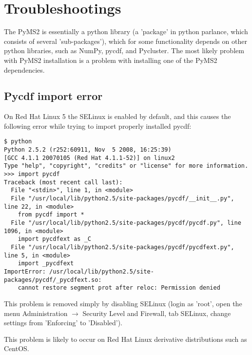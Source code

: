 \section{Troubleshootings}

The PyMS2 is essentially a python library (a 'package' in python parlance, which
consists of several 'sub-packages'), which for some functionality depends on
other python libraries, such as NumPy, pycdf, and Pycluster. The most likely
problem with PyMS2 installation is a problem with installing one of the PyMS2
dependencies.

\subsection{Pycdf import error}

On Red Hat Linux 5 the SELinux is enabled by default, and this causes the
following error while trying to import properly installed pycdf: 

\begin{verbatim}
$ python
Python 2.5.2 (r252:60911, Nov  5 2008, 16:25:39)
[GCC 4.1.1 20070105 (Red Hat 4.1.1-52)] on linux2
Type "help", "copyright", "credits" or "license" for more information.
>>> import pycdf
Traceback (most recent call last):
  File "<stdin>", line 1, in <module>
  File "/usr/local/lib/python2.5/site-packages/pycdf/__init__.py", line 22, in <module>
    from pycdf import *
  File "/usr/local/lib/python2.5/site-packages/pycdf/pycdf.py", line 1096, in <module>
    import pycdfext as _C
  File "/usr/local/lib/python2.5/site-packages/pycdf/pycdfext.py", line 5, in <module>
    import _pycdfext
ImportError: /usr/local/lib/python2.5/site-packages/pycdf/_pycdfext.so:
    cannot restore segment prot after reloc: Permission denied
\end{verbatim}

This problem is removed simply by disabling SELinux (login as 'root', open the menu
Administration $\rightarrow$ Security Level and Firewall, tab SELinux, change settings
from 'Enforcing' to 'Disabled').

This problem is likely to occur on Red Hat Linux derivative distributions such as CentOS.

